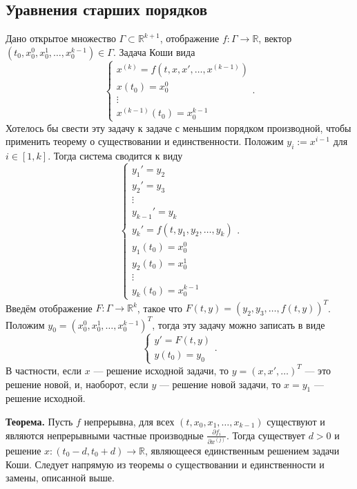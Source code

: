 \subsection{Уравнения старших порядков}
Дано открытое множество $\Gamma \subset \mathbb R^{k+1}$, отображение $f: \Gamma \to \mathbb R$, вектор $(t_0, x_0^0, x_0^1, \dots, x_0^{k-1}) \in \Gamma$.
Задача Коши вида
\[
    \begin{cases}
        x^{(k)} = f(t, x, x', \dots, x^{(k-1)}) \\
        x(t_0) = x_0^0 \\
        \vdots \\
        x^{(k-1)}(t_0) = x_0^{k-1}
    \end{cases} .
\]
Хотелось бы свести эту задачу к задаче с меньшим порядком производной, чтобы применить теорему о существовании и единственности.
Положим $y_i := x^{i-1}$ для $i \in [1, k]$.
Тогда система сводится к виду
\[
    \begin{cases}
        y_1' = y_2 \\
        y_2' = y_3 \\
        \vdots \\
        y_{k-1}' = y_k \\
        y_k' = f(t, y_1, y_2, \dots, y_k) \\
        y_1(t_0) = x_0^0 \\
        y_2(t_0) = x_0^1 \\
        \vdots \\
        y_k(t_0) = x_0^{k-1}
    \end{cases} .
\]
Введём отображение $F: \Gamma \to \mathbb R^k$, такое что $F(t, y) = (y_2, y_3, \dots, f(t, y))^T$.
Положим $y_0 = (x_0^0, x_0^1, \dots, x_0^{k-1})^T$, тогда эту задачу можно записать в виде
\[
    \begin{cases}
        y' = F(t, y) \\
        y(t_0) = y_0
    \end{cases}.
\]
В частности, если $x$ --- решение исходной задачи, то $y = (x, x', \dots)^T$ --- это решение новой, и, наоборот, если $y$ --- решение новой задачи, то $x = y_1$ --- решение исходной.

\textbf{Теорема.} Пусть $f$ непрерывна, для всех $(t, x_0, x_1, \dots, x_{k-1})$ существуют и являются непрерывными частные производные $\frac{\partial f_i}{\partial x^{(j)}}$.
Тогда существует $d > 0$ и решение $x: (t_0 - d, t_0 + d) \to \mathbb R$, являющееся единственным решением задачи Коши.
Следует напрямую из теоремы о существовании и единственности и замены, описанной выше.

